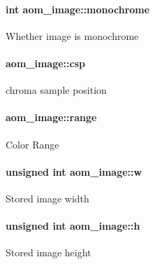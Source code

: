 \paragraph[{\texorpdfstring{monochrome}{monochrome}}]{\setlength{\rightskip}{0pt plus 5cm}int aom\+\_\+image\+::monochrome}\hypertarget{structaom__image_ab7886616025ff8bd0bb96d967fca9ad8}{}\label{structaom__image_ab7886616025ff8bd0bb96d967fca9ad8}
Whether image is monochrome 
\paragraph[{\texorpdfstring{csp}{csp}}]{ aom\+\_\+image\+::csp}\hypertarget{structaom__image_a4f235c521bc95a061e9e0b2a3d5d457e}{}\label{structaom__image_a4f235c521bc95a061e9e0b2a3d5d457e}
chroma sample position 
\paragraph[{\texorpdfstring{range}{range}}]{ aom\+\_\+image\+::range}\hypertarget{structaom__image_abcab05cb3e14a6391b9758f1954160d6}{}\label{structaom__image_abcab05cb3e14a6391b9758f1954160d6}
Color Range 
\paragraph[{\texorpdfstring{w}{w}}]{\setlength{\rightskip}{0pt plus 5cm}unsigned int aom\+\_\+image\+::w}\hypertarget{structaom__image_a695141e492ab146dc15e8131827eb237}{}\label{structaom__image_a695141e492ab146dc15e8131827eb237}
Stored image width 
\paragraph[{\texorpdfstring{h}{h}}]{\setlength{\rightskip}{0pt plus 5cm}unsigned int aom\+\_\+image\+::h}\hypertarget{structaom__image_a3fcffff0a25a4fd9218ed38842014ef2}{}\label{structaom__image_a3fcffff0a25a4fd9218ed38842014ef2}
Stored image height 
